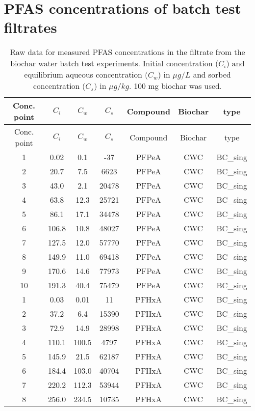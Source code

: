\chapter{PFAS concentrations of batch test filtrates}\label{appSec:rawdata} 

\begin{longtable}[c]{ccccccc}
\caption{Raw data for measured PFAS concentrations in the filtrate from the biochar water batch test experiments. Initial concentration ($C_i$) and equilibrium aqueous concentration ($C_w$) in $\mu g/L$ and sorbed concentration ($C_s$) in $\mu g/kg$. 100 mg biochar was used. \label{apptab:BC_batchtest}} \\
\toprule
Conc. point & $C_i$ & $C_w$ & $C_s$ & Compound & Biochar & type \\ \midrule \endfirsthead \toprule
Conc. point & $C_i$ & $C_w$ & $C_s$ & Compound & Biochar & type \\ \midrule \endhead
1 & 0.02 & 0.1 & -37 & PFPeA & CWC & BC\_sing \\
2 & 20.7 & 7.5 & 6623 & PFPeA & CWC & BC\_sing \\
3 & 43.0 & 2.1 & 20478 & PFPeA & CWC & BC\_sing \\
4 & 63.8 & 12.3 & 25721 & PFPeA & CWC & BC\_sing \\
5 & 86.1 & 17.1 & 34478 & PFPeA & CWC & BC\_sing \\
6 & 106.8 & 10.8 & 48027 & PFPeA & CWC & BC\_sing \\
7 & 127.5 & 12.0 & 57770 & PFPeA & CWC & BC\_sing \\
8 & 149.9 & 11.0 & 69418 & PFPeA & CWC & BC\_sing \\
9 & 170.6 & 14.6 & 77973 & PFPeA & CWC & BC\_sing \\
10 & 191.3 & 40.4 & 75479 & PFPeA & CWC & BC\_sing \\
1 & 0.03 & 0.01 & 11 & PFHxA & CWC & BC\_sing \\
2 & 37.2 & 6.4 & 15390 & PFHxA & CWC & BC\_sing \\
3 & 72.9 & 14.9 & 28998 & PFHxA & CWC & BC\_sing \\
4 & 110.1 & 100.5 & 4797 & PFHxA & CWC & BC\_sing \\
5 & 145.9 & 21.5 & 62187 & PFHxA & CWC & BC\_sing \\
6 & 184.4 & 103.0 & 40704 & PFHxA & CWC & BC\_sing \\
7 & 220.2 & 112.3 & 53944 & PFHxA & CWC & BC\_sing \\
8 & 256.0 & 234.5 & 10735 & PFHxA & CWC & BC\_sing \\

\end{longtable}
